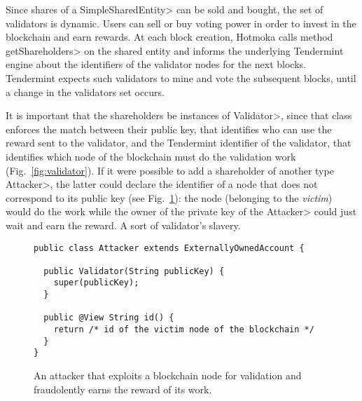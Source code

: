 Since shares of a \<SimpleSharedEntity> can be sold and bought, the set of validators
is dynamic. Users can sell or buy voting power in order to invest in the blockchain
and earn rewards. At each block creation, Hotmoka calls method \<getShareholders>
on the shared entity and informs the
underlying Tendermint engine about the identifiers of the validator nodes for the next blocks.
Tendermint expects such validators to mine and vote the subsequent blocks, until a change in the
validators set occurs.

It is important that the shareholders be instances of \<Validator>, since that class enforces the
match between their public key, that identifies who can use the reward sent to the validator,
and the Tendermint identifier of the validator, that identifies which node of the blockchain
must do the validation work (Fig.~\ref{fig:validator}).
If it were possible to add a shareholder of another
type \<Attacker>, the latter could declare the identifier of a node that does not correspond to its
public key (see Fig.~\ref{fig:attacker}):
the node (belonging to the \emph{victim}) would do the work while the owner
of the private key of the \<Attacker> could just wait and earn the reward.
A sort of validator's slavery.

\begin{figure}[t]
  \begin{center}
    \begin{lstlisting}[language=Takamaka]
public class Attacker extends ExternallyOwnedAccount {

  public Validator(String publicKey) {
    super(publicKey);
  }

  public @View String id() {
    return /* id of the victim node of the blockchain */
  }
}
    \end{lstlisting}
  \end{center}
  \caption{An attacker that exploits a blockchain node for validation and fraudolently earns the reward of its work.}\label{fig:attacker}
\end{figure}

